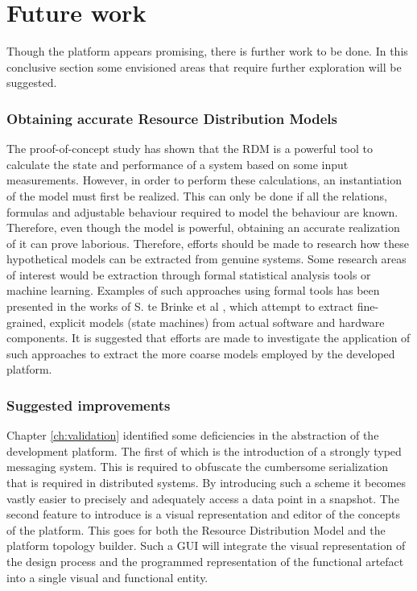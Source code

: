 \section{Future work}
Though the platform appears promising, there is further work to be done. In this conclusive section some envisioned areas that require further exploration will be suggested.

\subsubsection{Obtaining accurate Resource Distribution Models}
The proof-of-concept study has shown that the RDM is a powerful tool to calculate the state and performance of a system based on some input measurements. However, in order to perform these calculations, an instantiation of the model must first be realized. This can only be done if all the relations, formulas and adjustable behaviour required to model the behaviour are known. Therefore, even though the model is powerful, obtaining an accurate realization of it can prove laborious. Therefore, efforts should be made to research how these hypothetical models can be extracted from genuine systems. Some research areas of interest would be extraction through formal statistical analysis tools or machine learning. Examples of such approaches using formal tools has been presented in the works of S. te Brinke et al \cite{deriving_rum_1, deriving_rum_2}, which attempt to extract fine-grained, explicit models (state machines) from actual software and hardware components. It is suggested that efforts are made to investigate the application of such approaches to extract the more coarse models employed by the developed platform.

\subsubsection{Suggested improvements}
Chapter \ref{ch:validation} identified some deficiencies in the abstraction of the development platform. The first of which is the introduction of a strongly typed messaging system. This is required to obfuscate the cumbersome serialization that is required in distributed systems. By introducing such a scheme it becomes vastly easier to precisely and adequately access a data point in a snapshot.
The second feature to introduce is a visual representation and editor of the concepts of the platform. This goes for both the Resource Distribution Model and the platform topology builder. Such a GUI will integrate the visual representation of the design process and the programmed representation of the functional artefact into a single visual and functional entity.


